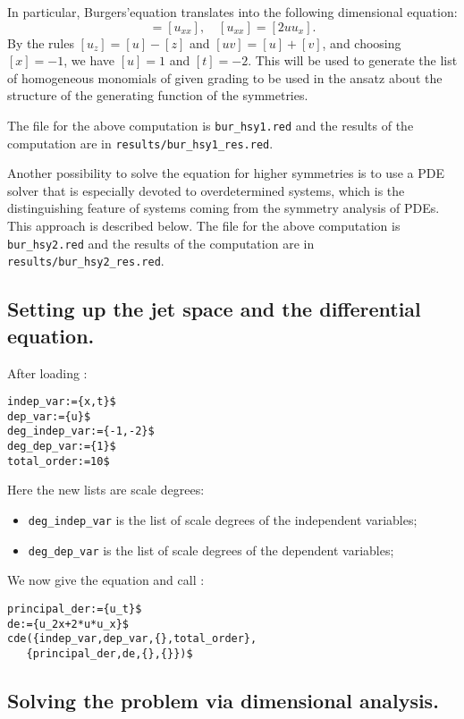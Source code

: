 In particular, Burgers'equation translates into the following dimensional
equation:
\begin{displaymath}
  [u_t]=[u_{xx}],\quad [u_{xx}]=[2uu_x].
\end{displaymath}
By the rules $[u_z]=[u]-[z]$ and $[uv]=[u]+[v]$, and choosing $[x]=-1$, we have
$[u]=1$ and $[t]=-2$. This will be used to generate the list of homogeneous
monomials of given grading to be used in the ansatz about the structure of the
generating function of the symmetries.

The file for the above computation is
\texttt{bur\_hsy1.red} and the results of the computation are in
\texttt{results/bur\_hsy1\_res.red}.

Another possibility to solve the equation for higher symmetries is to use a
PDE solver that is especially devoted to overdetermined systems, which is the
distinguishing feature of systems coming from the symmetry analysis of PDEs.
This approach is described below. The file for the above computation is
\texttt{bur\_hsy2.red} and the results of the computation are in
\texttt{results/bur\_hsy2\_res.red}.


\subsection{Setting up the jet space and the differential equation.}
\label{cdesec:setting-up-jet}

After loading \cde:
\begin{verbatim}
indep_var:={x,t}$
dep_var:={u}$
deg_indep_var:={-1,-2}$
deg_dep_var:={1}$
total_order:=10$
\end{verbatim}
Here the new lists are scale degrees:
\begin{itemize}
\item \texttt{deg\_indep\_var} is the list of scale degrees of the independent
  variables;
\item \texttt{deg\_dep\_var} is the list of scale degrees of the dependent
  variables;
\end{itemize}

We now give the equation and call \cde:
\begin{verbatim}
principal_der:={u_t}$
de:={u_2x+2*u*u_x}$
cde({indep_var,dep_var,{},total_order},
   {principal_der,de,{},{}})$
\end{verbatim}

\subsection{Solving the problem via dimensional analysis.}
\label{cdesec:solving-problem-via}

